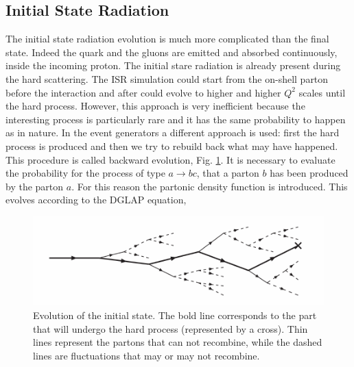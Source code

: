 \subsection*{Initial State Radiation}
The initial state radiation evolution is much more complicated than the final state. 
Indeed the quark and the gluons are   emitted  and absorbed continuously, inside the incoming proton. The initial stare radiation is already present during the hard scattering.
The ISR simulation could start from the on-shell parton before the interaction and after  could evolve to higher and higher $ Q ^ 2 $ scales until the hard process.
However, this approach is very inefficient because the  interesting  process  is particularly rare and  it has the same probability to happen as in nature. 
In the event generators a different approach is  used: first the hard process is produced and then  we try to rebuild back what may have happened. 
This procedure is called backward evolution, Fig. \ref{isr}.
It is necessary to evaluate the  probability for the process of type $ a \rightarrow bc $,  that a parton $ b $ has  been produced by the parton $ a $.
For this reason the  partonic density function is introduced.  This evolves according to the DGLAP \cite{Altarelli:1977zs} equation,
\begin{figure}
\centering
\includegraphics[scale= 0.8]{../Cap3/Fig_MC/isr}
\caption{ Evolution of the initial state. The bold line corresponds to the part that will undergo the hard process (represented by a cross). Thin lines represent the partons that can not recombine, while the dashed lines are fluctuations that may or may not recombine.  }
\label{isr}
\end{figure}

